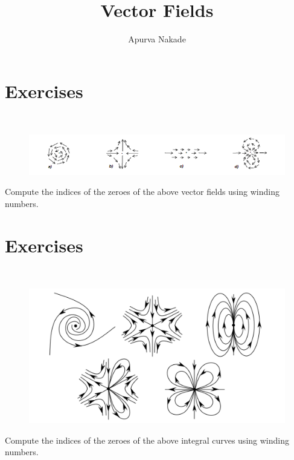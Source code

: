 \title{Vector Fields}
\author{Apurva Nakade}
\thispagestyle{fancy}
\maketitle

\section{Exercises}
\begin{exercise} $\quad$
	\begin{figure}[H]
		\centering
		\includegraphics[width=1\linewidth]{images/VectorFields}
	\end{figure}
	Compute the indices of the zeroes of the above vector fields using winding numbers.\\
\end{exercise}

\section{Exercises}
\begin{exercise} $\quad$
	\begin{figure}[H]
		\centering
		\includegraphics[width=.60\linewidth]{images/VectorFields2}
	\end{figure}
	Compute the indices of the zeroes of the above integral curves using winding numbers.\\
\end{exercise}

